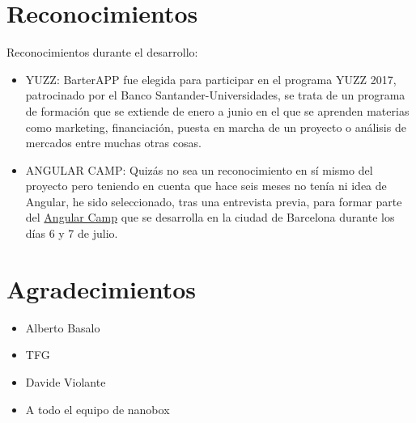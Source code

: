    
   \section{Reconocimientos}\label{reconocimientos}
   
   Reconocimientos durante el desarrollo:
   
   \begin{itemize}
	\item YUZZ: BarterAPP fue elegida para participar en el programa YUZZ 2017, patrocinado por el Banco Santander-Universidades, se trata de un programa de formación que se extiende de enero a junio en el que se aprenden materias como marketing, financiación, puesta en marcha de un proyecto o análisis de mercados entre muchas otras cosas. 
	\item ANGULAR CAMP: Quizás no sea un reconocimiento en sí mismo del proyecto pero teniendo en cuenta que hace seis meses no tenía ni idea de Angular, he sido seleccionado, tras una entrevista previa, para formar parte del  \href{https://angularcamp.org/}{Angular Camp} que se desarrolla en la ciudad de Barcelona durante los días 6 y 7 de julio.
\end{itemize}


\section{Agradecimientos}\label{reconocimientos}
\begin{itemize}
		\item Alberto Basalo
		\item TFG
		\item Davide Violante
		\item A todo el equipo de nanobox
\end{itemize}


 
 